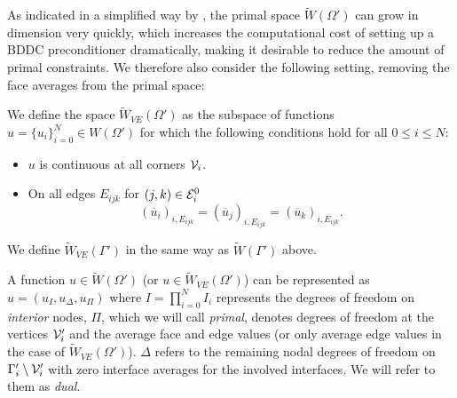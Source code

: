 As indicated in a simplified way by , the primal space $\widetilde{W}(\Omega')$ can grow in dimension very quickly, which increases the computational cost of setting up a BDDC preconditioner dramatically, making it desirable to reduce the amount of primal constraints. We therefore also consider the following setting, removing the face averages from the primal space:

\begin{definition}
\label{sec2:VE}
We define the space \newline
$\widetilde{W}_{VE}(\Omega')$ as the subspace of functions $u = \{u_i\}_{i=0}^N \in W(\Omega')$ for which the following conditions hold for all $0 \leq i \leq N$:
\begin{itemize}
    \item $u$ is continuous at all corners $\mathcal{V}_i$.
    \item On all edges $E_{ijk}$ for $(j,k) \in \mathcal{E}_i^0$
    \[(\overline{u}_i)_{i,E_{ijk}} = (\overline{u}_j)_{i,E_{ijk}} = (\overline{u}_k)_{i, E_{ijk}}.\]
\end{itemize}

We define $\widetilde{W}_{VE}(\Gamma')$ in the same way as $\widetilde{W}(\Gamma')$ above.
\end{definition}

A function $u \in \widetilde W(\Omega')$ (or $u \in \widetilde{W}_{VE}(\Omega')$) can be represented as $u = (u_I, u_{\Delta}, u_{\Pi})$ where $I = \prod_{i = 0}^N I_i$ represents the degrees of freedom on \textit{interior} nodes, $\Pi$, which we will call \textit{primal}, denotes degrees of freedom at the vertices $\mathcal{V}_i'$ and the average face and edge values (or only average edge values in the case of $\widetilde{W}_{VE}(\Omega')$). $\Delta$ refers to the remaining nodal degrees of freedom on $\Gamma_i' \setminus \mathcal{V}_i'$ with zero interface averages for the involved interfaces. We will refer to them as \textit{dual}.

